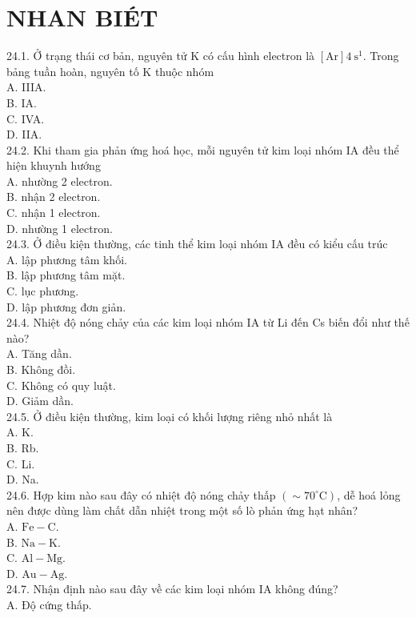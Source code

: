 \documentclass[10pt]{article}
\begin{document}
\section*{NHAN BIÉT}
24.1. Ở trạng thái cơ bản, nguyên tử K có cấu hình electron là $[\mathrm{Ar}] 4 \mathrm{~s}^{1}$. Trong bảng tuần hoàn, nguyên tố K thuộc nhóm\\
A. IIIA.\\
B. IA.\\
C. IVA.\\
D. IIA.\\
24.2. Khi tham gia phản ứng hoá học, mỗi nguyên tử kim loại nhóm IA đều thể hiện khuynh hướng\\
A. nhường 2 electron.\\
B. nhận 2 electron.\\
C. nhận 1 electron.\\
D. nhường 1 electron.\\
24.3. Ở điều kiện thường, các tinh thể kim loại nhóm IA đều có kiểu cấu trúc\\
A. lập phương tâm khối.\\
B. lập phương tâm mặt.\\
C. lục phương.\\
D. lập phương đơn giản.\\
24.4. Nhiệt độ nóng chảy của các kim loại nhóm IA từ Li đến Cs biến đổi như thế nào?\\
A. Tăng dần.\\
B. Không đồi.\\
C. Không có quy luật.\\
D. Giảm dần.\\
24.5. Ở điều kiện thường, kim loại có khối lượng riêng nhỏ nhất là\\
A. K.\\
B. Rb.\\
C. Li.\\
D. Na.\\
24.6. Hợp kim nào sau đây có nhiệt độ nóng chảy thấp $\left(\sim 70^{\circ} \mathrm{C}\right)$, dễ hoá lỏng nên được dùng làm chất dẫn nhiệt trong một số lò phản ứng hạt nhân?\\
A. $\mathrm{Fe}-\mathrm{C}$.\\
B. $\mathrm{Na}-\mathrm{K}$.\\
C. $\mathrm{Al}-\mathrm{Mg}$.\\
D. $\mathrm{Au}-\mathrm{Ag}$.\\
24.7. Nhận định nào sau đây về các kim loại nhóm IA không đúng?\\
A. Độ cứng thấp.\\
\end{document}
